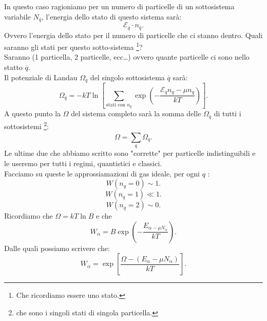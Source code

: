 In questo caso ragioniamo per un numero di particelle di un sottosistema variabile $N_{\overline{q}}$, l'energia dello stato di questo sistema sarà:
\[
	 \mathcal{E}_{\overline{q}}\cdot n_{\overline{q}}
.\] 
Ovvero l'energia dello stato per il numero di particelle che ci stanno dentro. Quali saranno gli stati per questo sotto-sistema \footnote{Che ricordiamo essere uno stato.}?\\
Saranno (1 particella, 2 particelle, ecc\ldots) ovvero quante particelle ci sono nello statto  $\overline{q}$.\\
Il potenziale di Landau $\Omega_{\overline{q}}$ del singolo sottosistema $\overline{q}$ sarà:
\[
	\Omega_{\overline{q}} = - kT 
	\ln \left[ \sum_{\text{stati con $n_{q}$}}^{} \exp\left( -\frac{\mathcal{E}_{q}n_{q}-\mu n_{q}}{kT} \right) 
\right] .\] \label{eq:Landau_gas_ideale}
A questo punto la $\Omega$ del sistema completo sarà la somma delle $\Omega_{\overline{q}}$ di tutti i sottosistemi \footnote{che sono i singoli stati di singola particella.}:
\[
	\Omega = \sum_{q}^{} \Omega_{q}
.\] 
Le ultime due che abbiamo scritto sono "corrette" per particelle indistinguibili e le useremo per tutti i regimi, quantistici e classici.\\ 
Facciamo su queste le approssiamazioni di gas ideale, per ogni $q$ :
\[
	W\left( n_{q}=0 \right) \sim 1 
.\] 
\[
	W\left( n_{q}=1 \right) \ll 1
.\] 
\[
	W\left( n_{q}=2 \right) \sim 0
.\] 
Ricordiamo che $\Omega = kT \ln B$ e che
\[
	W_{\alpha}= B \exp\left( -\frac{E_{\alpha-\mu N_{\alpha}}}{kT} \right) 
.\] 
Dalle quali possiamo scrivere che:
\[
	W_{\alpha} = \exp\left[ \frac{\Omega-\left( E_{\alpha}-\mu N_{\alpha} \right) }{kT} \right] 
.\] 

